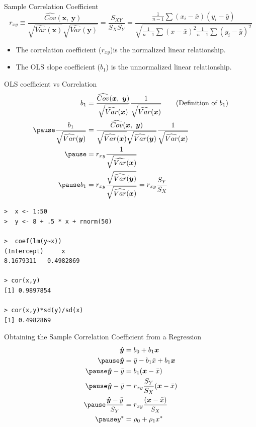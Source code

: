 \documentclass[aspectratio=169, handout]{beamer}
\numberwithin{equation}{section}
\begin{document}
\begin{frame}{Sample Correlation Coefficient}
$$r_{xy}\equiv \frac{\widehat{Cov}(\bm{x},\ \bm{y})}{\sqrt{\widehat{Var}(\bm{x})}\sqrt{\widehat{Var}(\bm{y})}}=\frac{S_{XY}}{S_XS_Y}=\frac{\frac{1}{n-1}\sum(x_i-\bar{x})(y_i-\bar{y})}{\sqrt{\frac{1}{n-1}\sum(x-\bar{x})^2\frac{1}{n-1}\sum(y_i-\bar{y})^2}}$$
\begin{itemize}
\item The correlation coefficient ($r_{xy}$)is the normalized linear relationship.
\item The OLS slope coefficient ($b_1$) is the unnormalized linear relationship. 
\end{itemize}
\end{frame}

\begin{frame}{OLS coefficient vs Correlation}
\begin{align*}
b_1&=\frac{\widehat{Cov}(\bm{x},\ \bm{y})}{\sqrt{\widehat{Var}(\bm{x})}} \frac{1}{\sqrt{\widehat{Var}(\bm{x})}} \tag{Definition of $b_1$}\\\pause
\frac{b_1}{\sqrt{\widehat{Var}(\bm{y})}}&=\frac{\widehat{Cov}(\bm{x},\ \bm{y})}{\sqrt{\widehat{Var}(\bm{x})}\sqrt{\widehat{Var}(\bm{y})}} \frac{1}{\sqrt{\widehat{Var}(\bm{x})}}\\\pause
&=r_{xy} \frac{1}{\sqrt{\widehat{Var}(\bm{x})}} \\\pause
b_1&=r_{xy} \frac{\sqrt{\widehat{Var}(\bm{y})}}{\sqrt{\widehat{Var}(\bm{x})}}=r_{xy}\frac{S_Y}{S_X}
\end{align*}
\end{frame}



\begin{frame}[fragile]
  \begin{lstlisting}
>  x <- 1:50
>  y <- 8 + .5 * x + rnorm(50)

>  coef(lm(y~x))
(Intercept)     x 
8.1679311   0.4982869 

> cor(x,y)
[1] 0.9897854

> cor(x,y)*sd(y)/sd(x)
[1] 0.4982869

   \end{lstlisting}
\end{frame}



\begin{frame}{Obtaining the Sample Correlation Coefficient from a Regression}
\begin{align*}
\bm{\hat{y}}&=b_0+b_1\bm{x}\\\pause
\bm{\hat{y}}&= \bar{y}-b_1\bar{x}+b_1\bm{x}\\\pause
\bm{\hat{y}}-\bar{y}&=b_1(\bm{x}-\bar{x})\\\pause
\bm{\hat{y}}-\bar{y}&=r_{xy}\frac{S_Y}{S_X}(\bm{x}-\bar{x})\\\pause
\frac{\bm{\hat{y}}-\bar{y}}{S_Y}&=r_{xy}\frac{(\bm{x}-\bar{x})}{S_X}\\ \pause
y^*&=\rho_0+\rho_1 x^*
\end{align*}
\end{frame}
\end{document}
